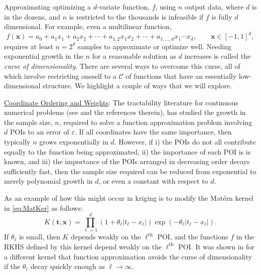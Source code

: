 \documentclass[11pt]{NSFamsart}
\newcommand{\Upara}[1]{\noindent\underline{\upshape #1}:}
\newcommand{\bx}{{\boldsymbol{x}}}
\newcommand{\bt}{{\boldsymbol{t}}}
\newcommand{\calc}{{\mathcal{C}}}
\def\abs#1{\ensuremath{\left \lvert #1 \right \rvert}}
\begin{document}
Approximating optimizing a $d$-variate function, $f$, using $n$ output data, where $d$ is in the dozens, and $n$ is restricted to the thousands is infeasible if $f$ is fully $d$ dimensional.  For example, even a multilinear function,
\begin{equation*}
f(\bx) = a_0 + a_1 x_1 + a_2 x_2 + \cdots + a_{1,2} x_1 x_2 + \cdots + a_{1,\ldots, d}x_1 \cdots x_d, \qquad \bx \in [-1,1]^d,
\end{equation*}
requires at least $n = 2^d$ samples to approximate or optimize well.  Needing exponential growth in the $n$ for a reasonable solution as $d$ increases is called the \emph{curse of dimensionality}.  There are several ways to overcome this curse, all of which involve restricting oneself to a $\calc$ of functions that have an essentially low-dimensional structure.  We highlight a couple of ways that we will explore.

\Upara{Coordinate Ordering and Weights}
The tractability literature for continuous numerical problems (see \cite{DicEtal14a,NovWoz08a, NovWoz10a, NovWoz12a} and the references therein), has studied the growth in the sample size, $n$, required to solve a function approximation problem involving $d$ POIs to an error of $\varepsilon$.  If all coordinates have the same importance, then typically $n$ grows exponentially in $d$. However, if i) the POIs do not all contribute equally to the function being approximated, ii) the importance of each POI is is known, and iii) the importance of the POIs arranged in decreasing order decays sufficiently fast, then the sample size required can be reduced from exponential to merely polynomial growth in $d$, or even a constant with respect to $d$.


As an example of how this might occur in kriging is to modify the Mat\'ern kernel in \eqref{eq:MatKer} as follows:
\begin{equation*}%
K(\bt,\bx) = \prod_{\ell = 1}^d (1 + \theta_\ell \abs{t_\ell-x_\ell}) \exp(-\theta_\ell \abs{t_\ell-x_\ell}).
\end{equation*}
If $\theta_\ell$ is small, then $K$ depends weakly on the $\ell^{\text{th}}$ POI, and the functions $f$ in the RKHS defined by this kernel depend weakly on the $\ell^{\text{th}}$ POI.  It was shown in \cite{FasHicWoz12b, FasHicWoz12a} for a different kernel that function approximation avoids the curse of dimensionality if the $\theta_\ell$ decay quickly enough as $\ell \to \infty$.
\end{document}
